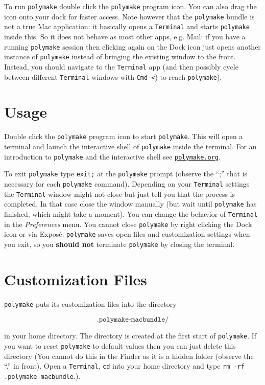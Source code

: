 \documentclass[a4paper]{amsart}
\newcommand{\polymake}{\texttt{polymake}\xspace}
\begin{document}
To run \polymake double click the \polymake program icon. You can also drag the icon onto your dock for faster access. Note however that the \polymake bundle is not a true Mac application: it basically opens a \texttt{Terminal} and starts \polymake inside this. So it does not behave as most other apps, e.g. Mail: if you have a running \polymake session then clicking again on the Dock icon just opens another instance of \polymake instead of bringing the existing window to the front. Instead, you should navigate to the \texttt{Terminal} app (and then possibly cycle between different \texttt{Terminal} windows with \texttt{Cmd-<}) to reach \polymake).

\section*{Usage}

Double click the \polymake program icon to start \polymake. This will open a terminal and launch the interactive shell of \polymake inside the terminal. For an introduction to \polymake and the interactive shell see \href{http://polymake.org}{\tt polymake.org}\;.

To exit \polymake type \texttt{exit;} at the \polymake prompt (observe the ``;'' that is necessary for each \polymake command). Depending on your \texttt{Terminal} settings the \texttt{Terminal} window might not close but just tell you that the process is completed. In that case close the window manually (but wait until \polymake has finished, which might take a moment). You can change the behavior of \texttt{Terminal} in the \textit{Preferences} menu.  You cannot close \polymake by right clicking the Dock icon or via Expos\`e. \polymake saves open files and customization settings when you exit, so you \textbf{should not} terminate \polymake by closing the terminal.

\section*{Customization Files}

\polymake puts its customization files into the directory 

\[\texttt{.polymake-macbundle/} \]

in your home directory. The directory is created at the first start of \polymake. If you want to reset \polymake to default values then you can just delete this directory (You cannot do this in the Finder as it is a hidden folder (observe the ``.'' in front). Open a \texttt{Terminal}, \texttt{cd} into your home directory and type \texttt{rm -rf .polymake-macbundle}.).
\end{document}
